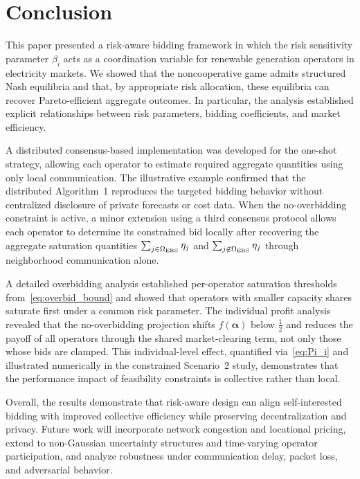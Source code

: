 \documentclass[conference]{IEEEtran}
\begin{document}
\section{Conclusion}

This paper presented a risk-aware bidding framework in which the risk sensitivity parameter $\beta_i$ acts as a coordination variable for renewable generation operators in electricity markets. We showed that the noncooperative game admits structured Nash equilibria and that, by appropriate risk allocation, these equilibria can recover Pareto-efficient aggregate outcomes. In particular, the analysis established explicit relationships between risk parameters, bidding coefficients, and market efficiency.

A distributed consensus-based implementation was developed for the one-shot strategy, allowing each operator to estimate required aggregate quantities using only local communication. The illustrative example confirmed that the distributed Algorithm~1 reproduces the targeted bidding behavior without centralized disclosure of private forecasts or cost data. When the no-overbidding constraint is active, a minor extension using a third consensus protocol allows each operator to determine its constrained bid locally after recovering the aggregate saturation quantities $\sum_{j\in\Omega_{\rm ERS}}\eta_j$ and $\sum_{j\not\in\Omega_{\rm ERS}}\eta_j$ through neighborhood communication alone.

A detailed overbidding analysis established per-operator saturation thresholds from~\eqref{eq:overbid_bound} and showed that operators with smaller capacity shares saturate first under a common risk parameter. The individual profit analysis revealed that the no-overbidding projection shifts $f(\boldsymbol{\alpha})$ below $\tfrac{1}{2}$ and reduces the payoff of all operators through the shared market-clearing term, not only those whose bids are clamped. This individual-level effect, quantified via~\eqref{eq:Pi_i} and illustrated numerically in the constrained Scenario~2 study, demonstrates that the performance impact of feasibility constraints is collective rather than local.

Overall, the results demonstrate that risk-aware design can align self-interested bidding with improved collective efficiency while preserving decentralization and privacy. Future work will incorporate network congestion and locational pricing, extend to non-Gaussian uncertainty structures and time-varying operator participation, and analyze robustness under communication delay, packet loss, and adversarial behavior.



\end{document}
